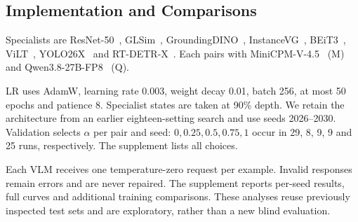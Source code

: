 \subsection{Implementation and Comparisons}
Specialists are ResNet-50~\cite{resnet}, GLSim~\cite{glsim}, GroundingDINO~\cite{groundingdino}, InstanceVG~\cite{instancevg}, BEiT3~\cite{beit3}, ViLT~\cite{vilt}, YOLO26X~\cite{yolo26} and RT-DETR-X~\cite{rtdetr}. Each pairs with MiniCPM-V-4.5~\cite{minicpm} (M) and Qwen3.8-27B-FP8~\cite{qwen38} (Q).

LR uses AdamW, learning rate 0.003, weight decay 0.01, batch 256, at most 50 epochs and patience 8. Specialist states are taken at 90\% depth. We retain the architecture from an earlier eighteen-setting search and use seeds 2026--2030. Validation selects $\alpha$ per pair and seed: $0,0.25,0.5,0.75,1$ occur in 29, 8, 9, 9 and 25 runs, respectively. The supplement lists all choices.

Each VLM receives one temperature-zero request per example. Invalid responses remain errors and are never repaired. The supplement reports per-seed results, full curves and additional training comparisons. These analyses reuse previously inspected test sets and are exploratory, rather than a new blind evaluation.
